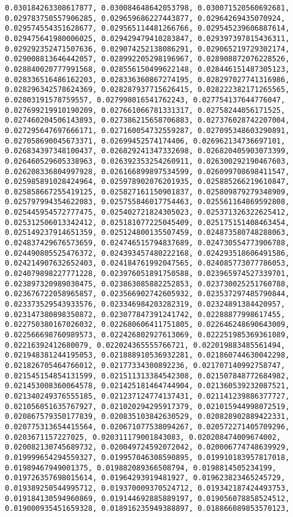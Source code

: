 \documentclass[11pt]{article}
\begin{document}
\begin{Verbatim}[commandchars=\\\{\}]
0.030184263308617877, 0.030084648642053798, 0.030071520560692681, 0.029783750557906285, 0.029659686227443877, 0.02964269435070924, 0.029574554351628677, 0.029565114481266766, 0.029545239606887614, 0.029475641980006025, 0.029429479410283847, 0.029397397815436311, 0.029292352471507636, 0.029074252138086291, 0.029065219729302174, 0.029008813646442057, 0.028992205298196967, 0.028908872076228526, 0.028840020777991568, 0.028556150499622148, 0.028446151487305123, 0.028336516486162203, 0.028336360867274195, 0.028297027741316986, 0.028296342578624369, 0.028287937715626415, 0.028222382171265565, 0.02803191578759557, 0.027998016541762243, 0.027754137644776047, 0.027699219910190209, 0.027661066781331317, 0.02758244056171525, 0.027460204506143893, 0.027386215658706883, 0.027376028742207004, 0.027295647697666171, 0.027160054732559287, 0.027095348603290891, 0.027058690045673371, 0.02699452574174406, 0.026962134736697101, 0.026834397348100437, 0.026829241347332698, 0.026820405903073399, 0.026460529605338963, 0.026392353254260911, 0.026300292190467603, 0.026208336804997928, 0.026166899897534599, 0.026099708698411547, 0.025985891028424964, 0.025978902076201935, 0.025885266219610847, 0.025858667255419125, 0.025827161150901837, 0.025809879279348909, 0.025797994354622083, 0.025755846017754463, 0.025561164869592808, 0.025445954572777475, 0.025402721824305023, 0.025371326322625412, 0.025312506013342412, 0.025181077225045409, 0.025175151408463454, 0.025149237914651359, 0.025124800135507459, 0.024873580748288063, 0.024837429676573659, 0.024746515794837689, 0.024730554773906788, 0.024490805525476372, 0.024393457480222168, 0.024293518606491586, 0.024214907632652403, 0.024184761992047565, 0.024085773077786053, 0.024079898227771228, 0.023976051891750588, 0.023965974527339701, 0.023897320989030475, 0.023863085882252853, 0.023730025251760788, 0.023676722058965857, 0.023566902742605932, 0.023537297485790844, 0.023373529543933576, 0.023346984203282319, 0.02324891384420957, 0.023147380898350872, 0.023077847391241742, 0.02288877998617455, 0.022750380167026032, 0.022680606411751805, 0.022646248690643009, 0.022566698760989573, 0.022426802927613069, 0.022251985369361089, 0.02216392412680079, 0.022024365555766721, 0.022019883485561494, 0.021948381244195053, 0.021888910536932281, 0.021860744630042298, 0.021826705464766012, 0.02177334300892236, 0.021707140992758747, 0.021545154854131599, 0.021511313384542308, 0.021507848772684982, 0.021453008360064578, 0.021425181464744904, 0.021360539232087521, 0.021340249376555185, 0.021237124774137431, 0.021141239886377727, 0.021056051635767927, 0.021020294295917379, 0.021015944998072519, 0.020867579350177839, 0.020835103842630529, 0.020828902889422331, 0.020775313654415564, 0.020671077538094267, 0.020572271405709296, 0.0203671157227025, 0.020311179001843083, 0.020208474009674002, 0.020082130745689732, 0.020049724592072042, 0.020006774748639929, 0.019999654294559327, 0.019957046308590895, 0.019910183957817018, 0.01989467949001375, 0.019882089366508794, 0.0198814505234199, 0.019726357698015614, 0.01964293919481927, 0.019623823465245729, 0.019389250544995712, 0.019370009370524712, 0.019342187424493753, 0.019184130594960869, 0.019144692885889197, 0.019056078858524512, 0.019000935451659328, 0.018916235949388897, 0.018866089853570123, 
\end{Verbatim}
\end{document}

